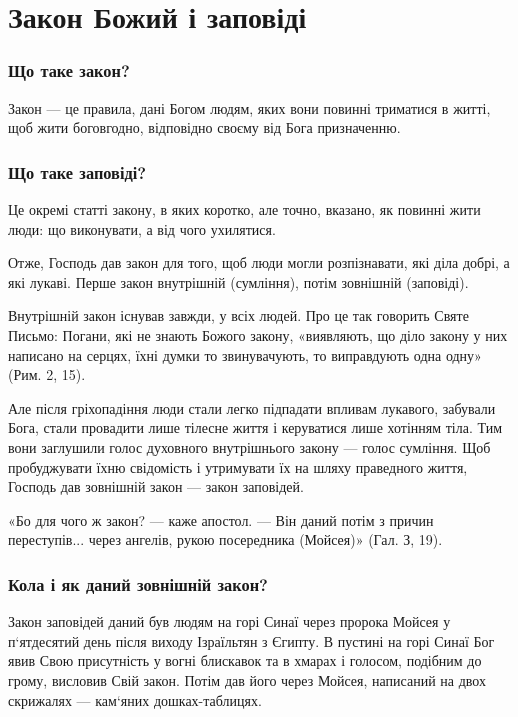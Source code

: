 \documentclass[main.tex]{subfiles}
\begin{document}
\chapter{Закон Божий і заповіді}

\subsection{Що таке закон?}

Закон — це правила, дані Богом людям, яких вони повинні триматися в житті, щоб жити боговгодно, відповідно своєму від Бога призначенню.

\subsection{Що таке заповіді?}

Це окремі статті закону, в яких коротко, але точно, вказано, як повинні жити люди: що виконувати, а від чого ухилятися.

Отже, Господь дав закон для того, щоб люди могли розпізнавати, які діла добрі, а які лукаві. Перше закон внутрішній (сумління), потім зовнішній (заповіді).

Внутрішній закон існував завжди, у всіх людей. Про це так говорить Святе Письмо: Погани, які не знають Божого закону, «виявляють, що діло закону у них написано на серцях, їхні думки то звинувачують, то виправдують одна одну» (Рим. 2, 15).

Але після гріхопадіння люди стали легко підпадати впливам лукавого, забували Бога, стали провадити лише тілесне життя і керуватися лише хотінням тіла. Тим вони заглушили голос духовного внутрішнього закону — голос сумління. Щоб пробуджувати їхню свідомість і утримувати їх на шляху праведного життя, Господь дав зовнішній закон — закон заповідей.
 
«Бо для чого ж закон? — каже апостол. — Він даний потім з причин переступів... через ангелів, рукою посередника (Мойсея)» (Гал. З, 19).

\subsection{Кола і як даний зовнішній закон?}

Закон заповідей даний був людям на горі Синаї через пророка Мойсея у п`ятдесятий день після виходу Ізраїльтян з Єгипту. В пустині на горі Синаї Бог явив Свою присутність у вогні блискавок та в хмарах і голосом, подібним до грому, висловив Свій закон. Потім дав його через Мойсея, написаний на двох скрижалях — кам`яних дошках-таблицях.
\end{document}
